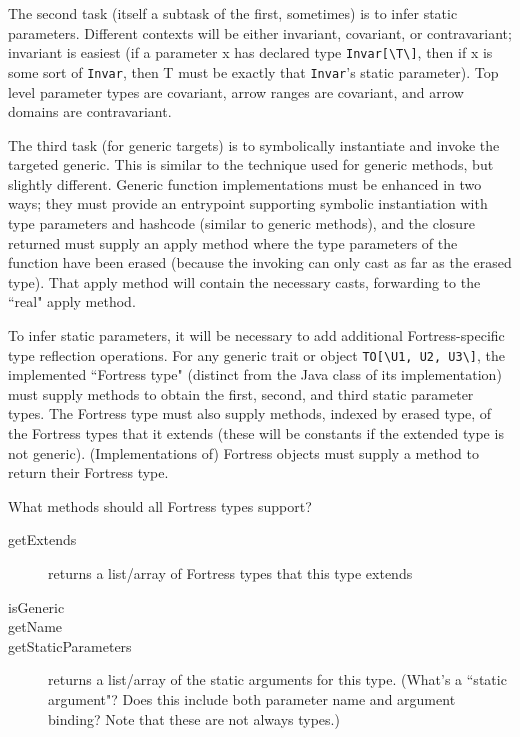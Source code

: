 \documentclass[11pt]{article}
\begin{document}
The second task (itself a subtask of the first, sometimes) is to infer static parameters.  Different contexts will be either invariant, covariant, or contravariant; invariant is easiest (if a parameter x has declared type \verb+Invar[\T\]+, then if x is some sort of \verb+Invar+, then T must be exactly that \verb+Invar+'s static parameter).  Top level parameter types are covariant, arrow ranges are covariant, and arrow domains are contravariant.

The third task (for generic targets) is to symbolically instantiate and invoke the targeted generic.  This is similar to the technique used for generic methods, but slightly different.  Generic function implementations must be enhanced in two ways; they must provide an entrypoint supporting symbolic instantiation with type parameters and hashcode (similar to generic methods), and the closure returned must supply an apply method where the type parameters of the function have been erased (because the invoking can only cast as far as the erased type).  That apply method will contain the necessary casts, forwarding to the ``real" apply method.

To infer static parameters, it will be necessary to add additional Fortress-specific type reflection operations.
For any generic trait or object \verb+TO[\U1, U2, U3\]+, the implemented ``Fortress type" (distinct from the Java class of its implementation) must supply methods to obtain the first, second, and third static parameter types.  The Fortress type must also supply methods, indexed by erased type, of the Fortress types that it extends (these will be constants if the extended type is not generic).  (Implementations of) Fortress objects must supply a method to return their Fortress type.

What methods should all Fortress types support?
\begin{description}
\item[getExtends] returns a list/array of Fortress types that this type extends
\item[isGeneric] 
\item[getName] 
\item[getStaticParameters] returns a list/array of the static arguments for this type.  (What's a ``static argument"?  Does this include both parameter name and argument binding?  Note that these are not always types.)
\end{description}
\end{document}
